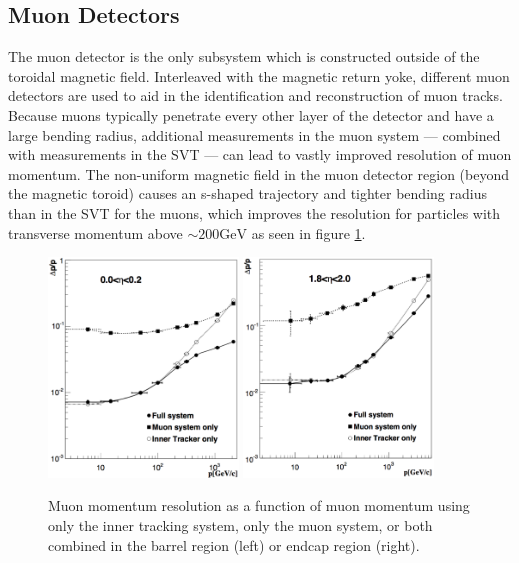\subsection{Muon Detectors}
\label{subsec:muondetector}
The muon detector is the only subsystem which is constructed outside of the toroidal magnetic field. Interleaved with the magnetic return yoke, different muon detectors are used to aid in the identification and reconstruction of muon tracks. Because muons typically penetrate every other layer of the detector and have a large bending radius, additional measurements in the muon system --- combined with measurements in the SVT --- can lead to vastly improved resolution of muon momentum. The non-uniform magnetic field in the muon detector region (beyond the magnetic toroid) causes an s-shaped trajectory and tighter bending radius than in the SVT for the muons, which improves the resolution for particles with transverse momentum above $\sim200\text{GeV}$ as seen in figure \ref{fig:muonSigma}.
 \begin{figure}
	\centering
	\includegraphics[width=0.45\textwidth]{detector/figs/muonResInner}
	\includegraphics[width=0.45\textwidth]{detector/figs/muonResOuter}
	\renewcommand{\baselinestretch}{1.0}
	\caption[Muon momentum resolution as a function of muon momentum using only the inner tracking system, only the muon system, or both combined in the barrel region (left) or endcap region (right).]{Muon momentum resolution as a function of muon momentum using only the inner tracking system, only the muon system, or both combined in the barrel region (left) or endcap region (right).}
	\label{fig:muonSigma}
\end{figure}

